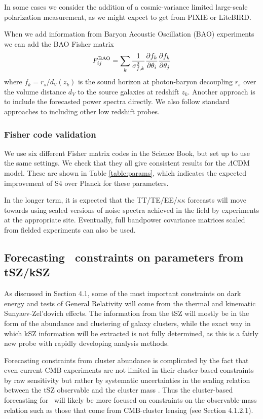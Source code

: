 In some cases we consider the addition of a cosmic-variance limited large-scale polarization measurement, as we might expect to get from PIXIE or LiteBIRD.

When we add information from Baryon Acoustic Oscillation (BAO) experiments we can add the BAO Fisher matrix
%
\begin{equation}
F_{ij}^{\rm BAO} = \sum_{k} \frac{1}{\sigma_{f,k}^2}\frac{\partial f_k}{\partial \theta_i}\frac{\partial f_k}{\partial \theta_j}
\end{equation}
%
where $f_k = r_s/d_V(z_k)$ is the sound horizon at photon-baryon decoupling $r_s$ over the volume distance $d_V$ to the source galaxies at redshift $z_k$. Another approach is to include the forecasted power spectra directly. We also follow standard approaches to including other low redshift probes.

\subsubsection{Fisher code validation}

We use six different Fisher matrix codes in the Science Book, but set up to use the same settings. We check that they all give consistent results for the $\Lambda$CDM model. These are shown in Table \ref{table:params}, which indicates the expected improvement of S4 over Planck for these parameters.


In the longer term, it is expected that the TT/TE/EE/$\kappa \kappa$ forecasts will move towards using scaled versions of noise spectra achieved in the field by experiments at the
appropriate site. Eventually, full bandpower covariance matrices scaled from fielded experiments can also be used.


\subsection{Forecasting \cmbexp\ constraints on parameters from tSZ/kSZ}

As discussed in Section 4.1, some of the most important constraints on dark energy and tests of 
General Relativity will come from the thermal and kinematic Sunyaev-Zel'dovich effects. The information
from the tSZ will mostly be in the form of the abundance and clustering of galaxy clusters, while the 
exact way in which kSZ information will be extracted is not fully determined, as this is a fairly new probe
with rapidly developing analysis methods.

Forecasting constraints from cluster abundance is complicated by the fact that even current CMB 
experiments are not limited in their cluster-based constraints by raw sensitivity but rather by systematic
uncertainties in the scaling relation between the tSZ observable and the cluster mass 
\cite{reichardt13,planck15-24}. Thus the cluster-based forecasting for \cmbexp\ will likely be more
focused on constraints on the observable-mass relation such as those that come from CMB-cluster
lensing (see Section 4.1.2.1).

